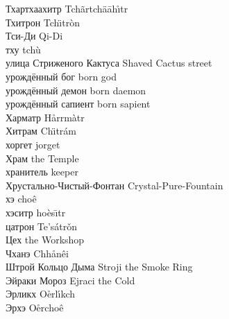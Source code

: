 \documentclass[a4paper,10pt]{book}
\begin{document}
Тхартхаахитр \hfill Tch\~{a}rtch\"{a}\={a}h\r{\i}tr\\
Тхитрон \hfill Tch\"{\i}tr\`{o}n\\
Тси-Ди \hfill Qi-Di\\
тху \hfill tch\`{u}\\
улица Стриженого Кактуса \hfill Shaved Cactus street\\
урождённый бог \hfill born god\\
урождённый демон \hfill born daemon\\
урождённый сапиент \hfill born sapient\\
Харматр \hfill H\r{a}rrm\`{a}tr\\
Хитрам \hfill Ch\"{\i}tr\'{a}m\\
хоргет \hfill jorget\\
Храм \hfill the Temple\\
хранитель \hfill keeper\\
Хрустально-Чистый-Фонтан \hfill Crystal-Pure-Fountain\\
хэ \hfill cho\^{e}\\
хэситр \hfill ho\`{e}s\={\i}tr\\
цатрон \hfill Te's\'{a}tr\v{o}n\\
Цех \hfill the Workshop\\
Чханэ \hfill Chh\r{a}n\^{e}i\\
Штрой Кольцо Дыма \hfill Stroji the Smoke Ring\\
Эйраки Мороз \hfill Ejraci the Cold\\
Эрликх \hfill O\r{e}rl\'{\i}kch\\
Эрхэ \hfill O\r{e}rcho\^{e}\\
\end{document}
